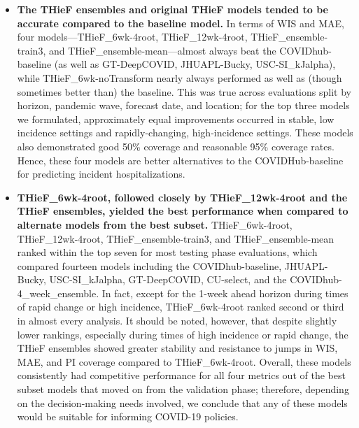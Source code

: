 \documentclass[12pt]{article}
\begin{document}
\begin{itemize}
\item \textbf{The THieF ensembles and original THieF models tended to be accurate compared to the baseline model.} \newline In terms of WIS and MAE, four models---THieF\_6wk-4root, THieF\_12wk-4root, THieF\_ensemble-train3, and THieF\_ensemble-mean---almost always beat the COVIDhub-baseline (as well as GT-DeepCOVID, JHUAPL-Bucky, USC-SI\_kJalpha), while THieF\_6wk-noTransform nearly always performed as well as (though sometimes better than) the baseline. This was true across evaluations split by horizon, pandemic wave, forecast date, and location; for the top three models we formulated, approximately equal improvements occurred in stable, low incidence settings and rapidly-changing, high-incidence settings. These models also demonstrated good 50\% coverage and reasonable 95\% coverage rates. Hence, these four models are better alternatives to the COVIDHub-baseline for predicting incident hospitalizations.

\item \textbf{THieF\_6wk-4root, followed closely by THieF\_12wk-4root and the THieF ensembles, yielded the best performance when compared to alternate models from the best subset.} \newline THieF\_6wk-4root, THieF\_12wk-4root, THieF\_ensemble-train3, and \newline THieF\_ensemble-mean ranked within the top seven for most testing phase evaluations, which compared fourteen models including the COVIDhub-baseline, JHUAPL-Bucky, USC-SI\_kJalpha, GT-DeepCOVID, CU-select, and the \newline COVIDhub-4\_week\_ensemble. In fact, except for the 1-week ahead horizon during times of rapid change or high incidence, THieF\_6wk-4root ranked second or third in almost every analysis. It should be noted, however, that despite slightly lower rankings, especially during times of high incidence or rapid change, the THieF ensembles showed greater stability and resistance to jumps in WIS, MAE, and PI coverage compared to THieF\_6wk-4root. Overall, these models consistently had competitive performance for all four metrics out of the best subset models that moved on from the validation phase; therefore, depending on the decision-making needs involved, we conclude that any of these models would be suitable for informing COVID-19 policies.


\end{itemize}
\end{document}
